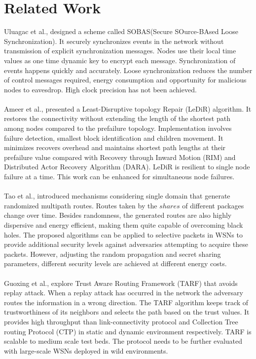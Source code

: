 \documentclass[journal]{IEEEtran}
\begin{document}
\section{Related Work}
Uluagac et al., \cite{SOBAS} designed a scheme called SOBAS(Secure SOurce-BAsed Loose Synchronization). It securely synchronizes events in the network without transmission of explicit synchronization messages. Nodes use their local time values as one time dynamic key to encrypt each message. Synchronization of events happens quickly and accurately. Loose synchronization reduces the number of control messages required, energy consumption and opportunity for malicious nodes to eavesdrop. High clock precision has not been achieved.\\ \\
\indent Ameer et al., \cite{LeDiR} presented a Least-Disruptive topology Repair (LeDiR) algorithm.  It restores the connectivity without extending the length of the shortest path among nodes compared to the prefailure topology. Implementation involves failure detection, smallest block identification and children movement. It minimizes recovers overhead and maintains shortest path lengths at their prefailure value compared with Recovery through Inward Motion (RIM) and Distributed Actor Recovery Algorithm (DARA). LeDiR is resilient to single node failure at a time. This work can be enhanced for simultaneous node failures.\\ \\
\indent Tao et al., \cite{SKL} introduced mechanisms considering single domain that generate randomized multipath routes. Routes taken by the $shares$ of different packages change over time. Besides randomness, the generated routes are also highly dispersive and energy efficient, making them quite capable of overcoming black holes. The proposed algorithms can be applied to selective packets in WSNs to provide additional security levels against adversaries attempting to acquire these packets. However, adjusting the random propagation and secret sharing parameters, different security levels are achieved at different energy costs.\\ \\
\indent Guoxing et al., \cite{TARF} explore Trust Aware Routing Framework (TARF) that avoids replay attack. When a replay attack has occurred in the network the adversary routes the information in a wrong direction. The TARF algorithm keeps track of trustworthiness of its neighbors and selects the path based on the trust values. It provides high throughput than link-connectivity protocol  and Collection Tree routing Protocol (CTP) in static and dynamic environment respectively. TARF is scalable to medium scale test beds. The protocol needs to be further evaluated with large-scale WSNs deployed in wild environments.\\ \\
\end{document}
